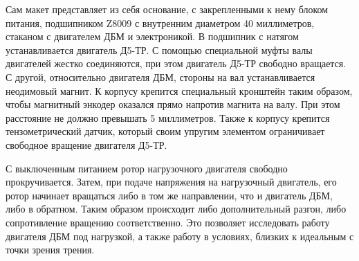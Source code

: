 Сам макет представляет из себя основание, с закрепленными к нему блоком питания, подшипником Z8009 
с внутренним диаметром 40 миллиметров, стаканом с двигателем ДБМ и электроникой. 
В подшипник с натягом устанавливается двигатель Д5-ТР. С помощью специальной муфты валы двигателей
жестко соединяются, при этом двигатель Д5-ТР свободно вращается. С другой, относительно двигателя ДБМ,
стороны на вал устанавливается неодимовый магнит. К корпусу крепится специальный кронштейн таким 
образом, чтобы магнитный энкодер оказался прямо напротив магнита на валу. При этом расстояние не должно
превышать 5 миллиметров. Также к корпусу крепится тензометрический
датчик, который своим упругим элементом ограничивает свободное вращение двигателя Д5-ТР.

С выключенным питанием ротор нагрузочного двигателя свободно прокручивается. Затем, при подаче
напряжения на нагрузочный двигатель, его ротор начинает вращаться либо в том же направлении, что и 
двигатель ДБМ, либо в обратном. Таким образом происходит либо дополнительный разгон, либо 
сопротивление вращению соответственно. Это позволяет исследовать работу двигателя ДБМ под нагрузкой,
а также работу в условиях, близких к идеальным с точки зрения трения.

